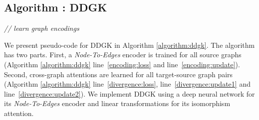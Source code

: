 \documentclass[sigconf]{acmart}
\newcommand{\ours}{\textsc{DDGK}}
\begin{document}
\subsection{Algorithm : \textsc{DDGK}}
\label{sec:alg_ddgk}

\IncMargin{1em}
\begin{algorithm}[t!]

\emph{// learn graph encodings}



\KwRet{\Embedding}
\caption{
DDGK: An unsupervised algorithm for learning graph representations.}
\label{algorithm:ddgk}
\end{algorithm}\DecMargin{1em}

We present pseudo-code for \ours{} in Algorithm \ref{algorithm:ddgk}. 
The algorithm has two parts. First, a \emph{Node-To-Edges} encoder is trained for all source graphs (Algorithm \ref{algorithm:ddgk} line~\ref{encoding:loss} and line~\ref{encoding:update}). 
Second, cross-graph attentions are learned for all target-source graph pairs (Algorithm \ref{algorithm:ddgk} line~\ref{divergence:loss}, line~\ref{divergence:update1} and line~\ref{divergence:update2}). 
We implement \ours{} using a deep neural network for its \emph{Node-To-Edges} encoder and linear transformations for its isomorphism attention. 
\end{document}
